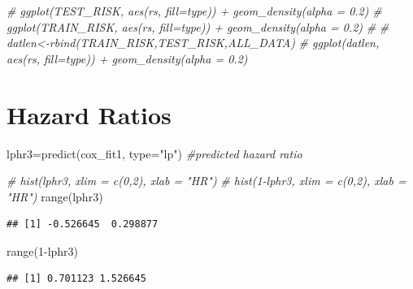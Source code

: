 \documentclass[
  11pt,
]{article}
\newenvironment{Shaded}{\begin{snugshade}}{\end{snugshade}}
\newcommand{\AttributeTok}[1]{\textcolor[rgb]{0.77,0.63,0.00}{#1}}
\newcommand{\CommentTok}[1]{\textcolor[rgb]{0.56,0.35,0.01}{\textit{#1}}}
\newcommand{\DecValTok}[1]{\textcolor[rgb]{0.00,0.00,0.81}{#1}}
\newcommand{\FloatTok}[1]{\textcolor[rgb]{0.00,0.00,0.81}{#1}}
\newcommand{\FunctionTok}[1]{\textcolor[rgb]{0.00,0.00,0.00}{#1}}
\newcommand{\NormalTok}[1]{#1}
\newcommand{\OtherTok}[1]{\textcolor[rgb]{0.56,0.35,0.01}{#1}}
\newcommand{\SpecialCharTok}[1]{\textcolor[rgb]{0.00,0.00,0.00}{#1}}
\newcommand{\StringTok}[1]{\textcolor[rgb]{0.31,0.60,0.02}{#1}}
\begin{document}
\begin{Shaded}
\begin{Highlighting}[]
\CommentTok{\# ggplot(TEST\_RISK, aes(rs, fill=type)) + geom\_density(alpha = 0.2) }
\CommentTok{\# ggplot(TRAIN\_RISK, aes(rs, fill=type)) + geom\_density(alpha = 0.2) }
\CommentTok{\# }
\CommentTok{\# datlen\textless{}{-}rbind(TRAIN\_RISK,TEST\_RISK,ALL\_DATA)}
\CommentTok{\# ggplot(datlen, aes(rs, fill=type)) + geom\_density(alpha = 0.2)}
\end{Highlighting}
\end{Shaded}

\newpage
\section{Hazard Ratios}

\begin{Shaded}
\begin{Highlighting}[]
\NormalTok{lphr3}\OtherTok{=}\FunctionTok{predict}\NormalTok{(cox\_fit1, }\AttributeTok{type=}\StringTok{"lp"}\NormalTok{) }\CommentTok{\#predicted hazard ratio}

\CommentTok{\# hist(lphr3, xlim = c(0,2), xlab = "HR")}
\CommentTok{\# hist(1{-}lphr3, xlim = c(0,2), xlab = "HR")}
\FunctionTok{range}\NormalTok{(lphr3)}
\end{Highlighting}
\end{Shaded}

\begin{verbatim}
## [1] -0.526645  0.298877
\end{verbatim}

\begin{Shaded}
\begin{Highlighting}[]
\FunctionTok{range}\NormalTok{(}\DecValTok{1}\SpecialCharTok{{-}}\NormalTok{lphr3)}
\end{Highlighting}
\end{Shaded}

\begin{verbatim}
## [1] 0.701123 1.526645
\end{verbatim}

\begin{Shaded}
\end{Shaded}
\end{document}
